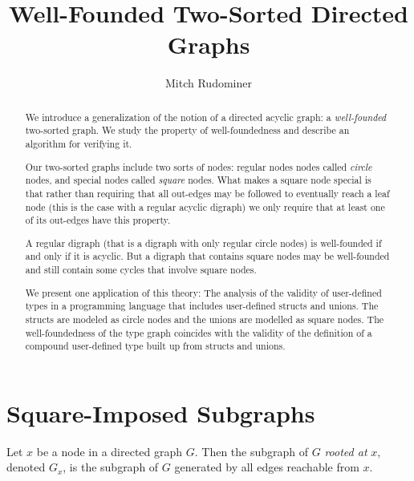 \documentclass[oneside,12pt]{amsart}
\begin{document}
\title{Well-Founded Two-Sorted Directed Graphs\vspace{-1cm}}
\author{Mitch Rudominer\vspace{-0.4cm}}
\address{Google}


\begin{abstract}
We introduce a generalization of the notion of a directed acyclic  graph:
a \emph{well-founded} two-sorted graph. We study the
property of well-foundedness and describe an algorithm for verifying it.

Our two-sorted graphs include two sorts of nodes: regular nodes
nodes called \emph{circle} nodes, and special nodes called \emph{square} nodes.
What makes a square node special is that rather than requiring that all
out-edges may be followed to eventually reach a leaf node (this is the
case with a regular acyclic digraph) we only require that at least one
of its out-edges have this property.

A regular digraph (that is a digraph with only regular circle nodes) is
well-founded if and only if it is acyclic. But a digraph that contains square
nodes may be well-founded and still contain some cycles that involve square
nodes.

We present one application of this theory: The analysis of the validity of
user-defined types in a programming language that includes user-defined structs and unions.
The structs are modeled as circle nodes and the unions are modelled as square
nodes. The well-foundedness of the type graph coincides with the validity
of the definition of a compound user-defined type built up from structs and unions.
\end{abstract}

\maketitle

\tableofcontents


\section{Square-Imposed Subgraphs}

\begin{definition}
Let $x$ be a node in a directed graph $G$. Then the subgraph of $G$ \emph{rooted at} $x$,
denoted $G_x$, is the subgraph of $G$ generated by all edges reachable from $x$.
\end{definition}
\end{document}
